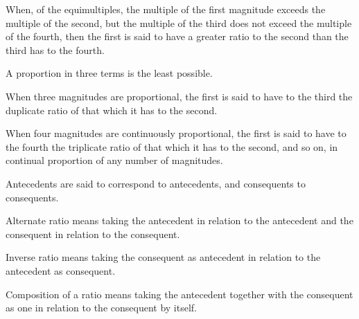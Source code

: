 \documentclass{rrxiv}
\begin{document}
\begin{scope}
\label{def:V.7}
When, of the equimultiples, the multiple of the first magnitude
exceeds the multiple of the second, but the multiple of the third
does not exceed the multiple of the fourth, then the first is said
to have a greater ratio to the second than the third has to the fourth.
\end{scope}

\begin{scope}
\label{def:V.8}
A proportion in three terms is the least possible.
\end{scope}

\begin{scope}
\label{def:V.9}
When three magnitudes are proportional, the first is said to have to
the third the duplicate ratio of that which it has to the second.
\end{scope}

\begin{scope}
\label{def:V.10}
When four magnitudes are continuously proportional, the first is said
to have to the fourth the triplicate ratio of that which it has to
the second, and so on, in continual proportion of any number of
magnitudes.
\end{scope}

\begin{scope}
\label{def:V.11}
Antecedents are said to correspond to antecedents, and consequents to
consequents.
\end{scope}

\begin{scope}
\label{def:V.12}
Alternate ratio means taking the antecedent in relation to the
antecedent and the consequent in relation to the consequent.
\end{scope}

\begin{scope}
\label{def:V.13}
Inverse ratio means taking the consequent as antecedent in relation
to the antecedent as consequent.
\end{scope}

\begin{scope}
\label{def:V.14}
Composition of a ratio means taking the antecedent together with the
consequent as one in relation to the consequent by itself.
\end{scope}
\end{document}
